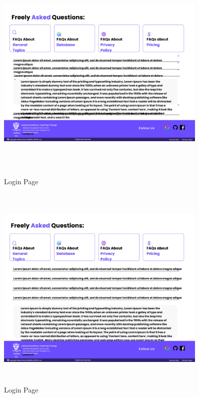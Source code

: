\begin{figure}[H]
\includegraphics[height=10cm, width=0.9\textwidth]{./images/prototype/0020}
\centering 
\caption{Login Page}
\label{fig:prototype1}

\includegraphics[height=10cm, width=0.9\textwidth]{./images/prototype/0021}
\centering 
\caption{Login Page}
\label{fig:prototype1}

\end{figure}